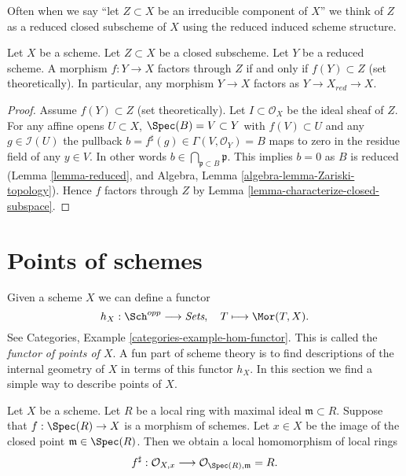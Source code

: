 \noindent
Often when we say ``let $Z \subset X$ be an irreducible component of $X$''
we think of $Z$ as a reduced closed subscheme of $X$ using the reduced induced
scheme structure.

\begin{lemma}
\label{lemma-map-into-reduction}
Let $X$ be a scheme.
Let $Z \subset X$ be a closed subscheme.
Let $Y$ be a reduced scheme.
A morphism $f : Y \to X$ factors through $Z$ if and only if
$f(Y) \subset Z$ (set theoretically). In particular, any
morphism $Y \to X$ factors as $Y \to X_{red} \to X$.
\end{lemma}

\begin{proof}
Assume $f(Y) \subset Z$ (set theoretically).
Let $I \subset \mathcal{O}_X$ be the ideal sheaf of $Z$.
For any affine opens $U \subset X$, $\Spec(B) = V \subset Y$
with $f(V) \subset U$ and any $g \in \mathcal{I}(U)$
the pullback $b = f^\sharp(g) \in \Gamma(V, \mathcal{O}_Y) = B$
maps to zero in the residue field of any $y \in V$.
In other words $b \in \bigcap_{\mathfrak p \subset B} \mathfrak p$.
This implies $b = 0$ as $B$ is reduced (Lemma \ref{lemma-reduced}, and
Algebra, Lemma \ref{algebra-lemma-Zariski-topology}).
Hence $f$ factors through
$Z$ by Lemma \ref{lemma-characterize-closed-subspace}.
\end{proof}










\section{Points of schemes}
\label{section-points}

\noindent
Given a scheme $X$ we can define a functor
$$
h_X : \Sch^{opp}
\longrightarrow
\textit{Sets}, \quad
T \longmapsto \Mor(T, X).
$$
See Categories, Example \ref{categories-example-hom-functor}.
This is called the {\it functor of points of $X$}.
A fun part of scheme theory is to find descriptions of
the internal geometry of $X$ in terms of this functor $h_X$.
In this section we find a simple way to describe
points of $X$.

\medskip\noindent
Let $X$ be a scheme. Let $R$ be a local ring with maximal ideal
$\mathfrak m \subset R$. Suppose that $f : \Spec(R) \to X$
is a morphism of schemes. Let $x \in X$ be the image of the closed point
$\mathfrak m \in \Spec(R)$. Then we obtain a local homomorphism
of local rings
$$
f^\sharp :
\mathcal{O}_{X, x}
\longrightarrow
\mathcal{O}_{\Spec(R), \mathfrak m} = R.
$$

